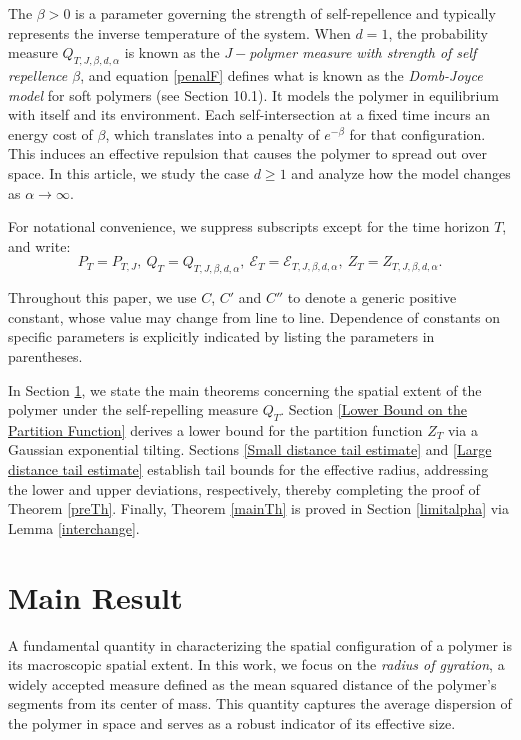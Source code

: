 \documentclass[12pt]{amsart}
\numberwithin{equation}{section}
\newcommand{\1}{\mathbf{1}}
\begin{document}
The $\beta>0$ is a parameter governing the strength of self-repellence and typically represents the inverse temperature of the system. When $d=1$, the probability measure $Q_{T,J,\beta,d,\alpha}$ is known as the \textit{$J-$polymer measure with strength of self repellence $\beta$}, and equation \eqref{penalF} defines what is known as the \textit{Domb-Joyce model} for soft polymers (see \cite{madras2013self} Section 10.1). It models the polymer in equilibrium with itself and its environment. Each self-intersection at a fixed time incurs an energy cost of $\beta$, which translates into a penalty of $e^{-\beta}$ for that configuration. This induces an effective repulsion that causes the polymer to spread out over space. In this article, we study the case $d\geq 1$ and analyze how the model changes as $\alpha\to\infty$.

For notational convenience, we suppress subscripts except for the time horizon $T$, and write:
\begin{equation*}
P_{T} = P_{T,J},~Q_{T}=Q_{T,J,\beta,d,\alpha},~\mathcal{E}_{T} = \mathcal{E}_{T,J,\beta,d,\alpha},~Z_{T}=Z_{T,J,\beta,d,\alpha}.
\end{equation*}

Throughout this paper, we use $C$, $C'$ and $C''$ to denote a generic positive constant, whose value may change from line to line. Dependence of constants on specific parameters is explicitly indicated by listing the parameters in parentheses.

In Section \ref{main_result}, we state the main theorems concerning the spatial extent of the polymer under the self-repelling measure $Q_T$. Section \ref{Lower Bound on the Partition Function} derives a lower bound for the partition function $Z_T$ via a Gaussian exponential tilting. Sections \ref{Small distance tail estimate} and \ref{Large distance tail estimate} establish tail bounds for the effective radius, addressing the lower and upper deviations, respectively, thereby completing the proof of Theorem \ref{preTh}. Finally, Theorem \ref{mainTh} is proved in Section \ref{limitalpha} via Lemma \ref{interchange}.

\section{Main Result}
\label{main_result}
A fundamental quantity in characterizing the spatial configuration of a polymer is its macroscopic spatial extent. In this work, we focus on the \textit{radius of gyration}, a widely accepted measure defined as the mean squared distance of the polymer's segments from its center of mass. This quantity captures the average dispersion of the polymer in space and serves as a robust indicator of its effective size.
\end{document}
